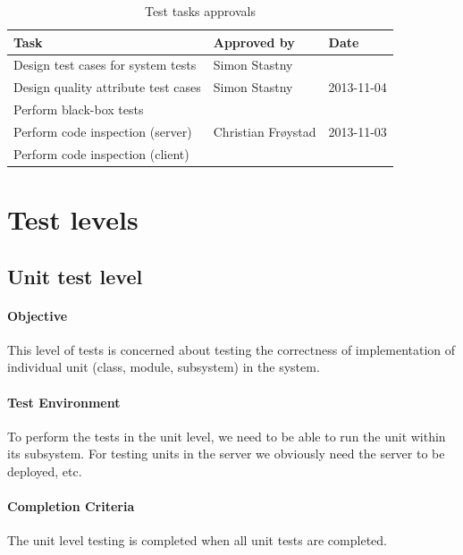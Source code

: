 \documentclass[11pt]{book}
\begin{document}
\begin{table}[H]
    \centering
    \begin{tabular}{| l | l | l |}
        \hline
        Task                                & Approved by             & Date           \\ \hline
        Design test cases for system tests  & Simon Stastny           &                \\ \hline
        Design quality attribute test cases & Simon Stastny           & 2013-11-04     \\ \hline
        Perform black-box tests             &                         &                \\ \hline
        Perform code inspection (server)    & Christian Frøystad      & 2013-11-03     \\ \hline
        Perform code inspection (client)    &                         &                \\ \hline
    \end{tabular}
    \caption{Test tasks approvals}
    \label{tab:test_plan_approvals}
\end{table}


\section{Test levels}\label{sec:testlevels}

\subsection{Unit test level}

\paragraph{Objective}
This level of tests is concerned about testing the correctness of implementation of individual unit (class, module, subsystem) in the system.

\paragraph{Test Environment}
To perform the tests in the unit level, we need to be able to run the unit within its subsystem. For testing units in the server we obviously need the server to be deployed, etc.

\paragraph{Completion Criteria}
The unit level testing is completed when all unit tests are completed.
\end{document}
